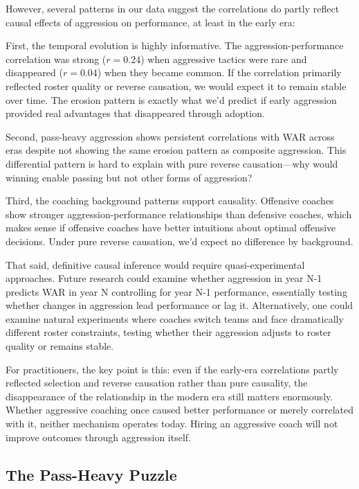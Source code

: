 \documentclass[11pt,twocolumn]{article}
\begin{document}
However, several patterns in our data suggest the correlations do partly reflect causal effects of aggression on performance, at least in the early era:

First, the temporal evolution is highly informative. The aggression-performance correlation was strong ($r=0.24$) when aggressive tactics were rare and disappeared ($r=0.04$) when they became common. If the correlation primarily reflected roster quality or reverse causation, we would expect it to remain stable over time. The erosion pattern is exactly what we'd predict if early aggression provided real advantages that disappeared through adoption.

Second, pass-heavy aggression shows persistent correlations with WAR across eras despite not showing the same erosion pattern as composite aggression. This differential pattern is hard to explain with pure reverse causation---why would winning enable passing but not other forms of aggression?

Third, the coaching background patterns support causality. Offensive coaches show stronger aggression-performance relationships than defensive coaches, which makes sense if offensive coaches have better intuitions about optimal offensive decisions. Under pure reverse causation, we'd expect no difference by background.

That said, definitive causal inference would require quasi-experimental approaches. Future research could examine whether aggression in year N-1 predicts WAR in year N controlling for year N-1 performance, essentially testing whether changes in aggression lead performance or lag it. Alternatively, one could examine natural experiments where coaches switch teams and face dramatically different roster constraints, testing whether their aggression adjusts to roster quality or remains stable.

For practitioners, the key point is this: even if the early-era correlations partly reflected selection and reverse causation rather than pure causality, the disappearance of the relationship in the modern era still matters enormously. Whether aggressive coaching once caused better performance or merely correlated with it, neither mechanism operates today. Hiring an aggressive coach will not improve outcomes through aggression itself.

\subsection{The Pass-Heavy Puzzle}
\end{document}
